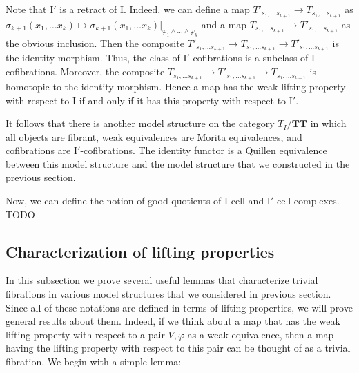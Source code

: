 \documentclass[reqno]{amsart}
\theoremstyle{definition}
\theoremstyle{remark}
\newcommand{\cat}[1]{\mathbf{#1}}
\newcommand{\algtt}{\cat{TT}}
\newcommand{\I}{\mathrm{I}}
\numberwithin{figure}{section}
\begin{document}
Note that $\I'$ is a retract of $\I$.
Indeed, we can define a map $T'_{s_1, \ldots s_{k+1}} \to T_{s_1, \ldots s_{k+1}}$ as $\sigma_{k+1}(x_1, \ldots x_k) \mapsto \sigma_{k+1}(x_1, \ldots x_k)|_{\varphi_1 \land \ldots \land \varphi_k}$
and a map $T_{s_1, \ldots s_{k+1}} \to T'_{s_1, \ldots s_{k+1}}$ as the obvious inclusion.
Then the composite $T'_{s_1, \ldots s_{k+1}} \to T_{s_1, \ldots s_{k+1}} \to T'_{s_1, \ldots s_{k+1}}$ is the identity morphism.
Thus, the class of $\I'$-cofibrations is a subclass of $\I$-cofibrations.
Moreover, the composite $T_{s_1, \ldots s_{k+1}} \to T'_{s_1, \ldots s_{k+1}} \to T_{s_1, \ldots s_{k+1}}$ is homotopic to the identity morphism.
Hence a map has the weak lifting property with respect to $\I$ if and only if it has this property with respect to $\I'$.

It follows that there is another model structure on the category $T_I/\algtt$ in which all objects are fibrant, weak equivalences are Morita equivalences, and cofibrations are $\I'$-cofibrations.
The identity functor is a Quillen equivalence between this model structure and the model structure that we constructed in the previous section.

Now, we can define the notion of good quotients of $\I$-cell and $\I'$-cell complexes.
TODO

\subsection{Characterization of lifting properties}

In this subsection we prove several useful lemmas that characterize trivial fibrations in various model structures that we considered in previous section.
Since all of these notations are defined in terms of lifting properties, we will prove general results about them.
Indeed, if we think about a map that has the weak lifting property with respect to a pair $V,\varphi$ as a weak equivalence,
then a map having the lifting property with respect to this pair can be thought of as a trivial fibration.
We begin with a simple lemma:
\end{document}
